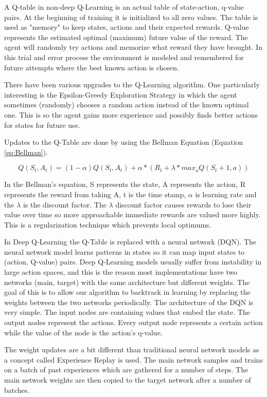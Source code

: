 \documentclass[b5paper]{book}
\begin{document}
A Q-table in non-deep Q-Learning is an actual table of state-action, q-value pairs. At the beginning of training it is initialized to all zero values. The table is used as "memory" to keep states, actions and their expected rewards. Q-value represents the estimated optimal (maximum) future value of the reward. The agent will randomly try actions and memorize what reward they have brought. In this trial and error process the environment is modeled and remembered for future attempts where the best known action is chosen.

There have been various upgrades to the Q-Learning algorithm. One particularly interesting is the Epsilon-Greedy Exploration Strategy in which the agent sometimes (randomly) chooses a random action instead of the known optimal one. This is so the agent gains more experience and possibly finds better actions for states for future use.

Updates to the Q-Table are done by using the Bellman Equation (Equation \ref{eq:Bellman}).

\begin{equation}
\label{eq:Bellman}
Q(S_t, A_t) = (1 - \alpha) Q(S_t, A_t) + \alpha * (R_t + \lambda * max_a Q(S_t+1, a))
\end{equation}

In the Bellman's equation, S represents the state, A represents the action, R represents the reward from taking A, t is the time stamp, \(\alpha\) is learning rate and the \(\lambda\) is the discount factor. The \(\lambda\) discount factor causes rewards to lose their value over time so more approachable immediate rewards are valued more highly. This is a regularization technique which prevents local optimums.

In Deep Q-Learning the Q-Table is replaced with a neural network (DQN). The neural network model learns patterns in states so it can map input states to (action, Q-value) pairs. Deep Q-Learning models usually suffer from instability in large action spaces, and this is the reason most implementations have two networks (main, target) with the same architecture but different weights. The goal of this is to allow our algorithm to backtrack in learning by replacing the weights between the two networks periodically. The architecture of the DQN is very simple. The input nodes are containing values that embed the state. The output nodes represent the actions. Every output node represents a certain action while the value of the node is the action's q-value. 

The weight updates are a bit different than traditional neural network models as a concept called Experience Replay is used. The main network samples and trains on a batch of past experiences which are gathered for a number of steps. The main network weights are then copied to the target network after a number of batches.
\end{document}
